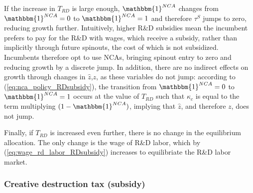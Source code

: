 \documentclass[11pt,english]{article}
\begin{document}
If the increase in $T_{RD}$ is large enough, $\mathbbm{1}^{NCA}$ changes from $\mathbbm{1}^{NCA} = 0$ to $\mathbbm{1}^{NCA} = 1$ and therefore $\tau^S$ jumps to zero, reducing growth further. Intuitively, higher R\&D subsidies mean the incumbent prefers to pay for the R\&D with wages, which receive a subsidy, rather than implicitly through future spinouts, the cost of which is not subsidized. Incumbents therefore opt to use NCAs, bringing spinout entry to zero and reducing growth by a discrete jump. In addition, there are no indirect effects on growth through changes in $\hat{z}$,$z$, as these variables do not jump: according to (\ref{eq:nca_policy_RDsubsidy}), the transition from $\mathbbm{1}^{NCA} = 0$ to $\mathbbm{1}^{NCA} =1$ occurs at the value of $T_{RD}$ such that $\kappa_c$ is equal to the term multiplying $(1-\mathbbm{1}^{NCA})$, implying that $\hat{z}$, and therefore $z$, does not jump.

Finally, if $T_{RD}$ is increased even further, there is no change in the equilibrium allocation. The only change is the wage of R\&D labor, which by (\ref{eq:wage_rd_labor_RDsubsidy}) increases to equilibriate the R\&D labor market.

\subsubsection{Creative destruction tax (subsidy)}
\end{document}
